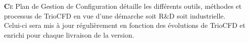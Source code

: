 \lhead{}

\lettrine[lines=2,slope=0pt,nindent=4pt]{\textbf{C}}{e} Plan de Gestion de Configuration détaille les différents outils, méthodes et processus de TrioCFD en vue d'une démarche soit R\&D soit industrielle.\\
Celui-ci sera mis à jour régulièrement en fonction des évolutions de TrioCFD et enrichi pour chaque livraison de la version.
\newpage